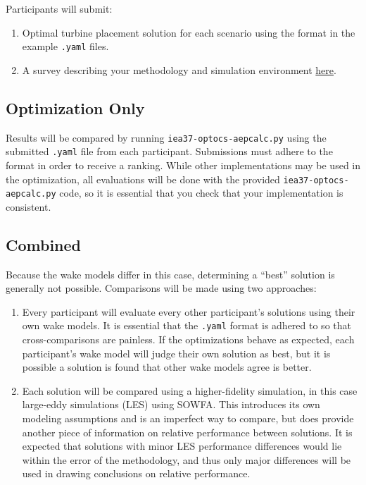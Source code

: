 \documentclass{article}
\begin{document}
    Participants will submit:
    \begin{enumerate}
        \item Optimal turbine placement solution for each scenario using the format in the example \texttt{.yaml} files. 
        \item A survey describing your methodology and simulation environment \url{here}.
    \end{enumerate}

    \subsection{Optimization Only}

        Results will be compared by running \texttt{iea37-optocs-aepcalc.py} using the submitted \texttt{.yaml} file from each participant.  Submissions must adhere to the format in order to receive a ranking.  While other implementations may be used in the optimization, all evaluations will be done with the provided \texttt{iea37-optocs-aepcalc.py} code, so it is essential that you check that your implementation is consistent.

    \subsection{Combined}

        Because the wake models differ in this case, determining a ``best'' solution is generally not possible.  Comparisons will be made using two approaches:
        \begin{enumerate}
            \item Every participant will evaluate every other participant's solutions using their own wake models.  It is essential that the \texttt{.yaml} format is adhered to so that cross-comparisons are painless.  If the optimizations behave as expected, each participant's wake model will judge their own solution as best, but it is possible a solution is found that other wake models agree is better.
            \item Each solution will be compared using a higher-fidelity simulation, in this case large-eddy simulations (LES) using SOWFA.  This introduces its own modeling assumptions and is an imperfect way to compare, but does provide another piece of information on relative performance between solutions.  It is expected that solutions with minor LES performance differences would lie within the error of the methodology, and thus only major differences will be used in drawing conclusions on relative performance.
        \end{enumerate}
\end{document}
